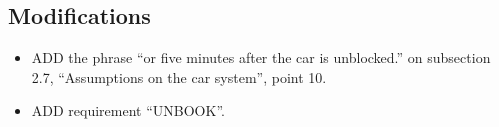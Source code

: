 \documentclass[11pt]{article} %
\begin{document}
\subsection{Modifications}
\begin{itemize}
	\item ADD the phrase ``or five minutes after the car is unblocked.'' on subsection 2.7, ``Assumptions on the car system'', point 10.
	\item ADD requirement ``UNBOOK''.
	
\end{itemize}
\end{document}
